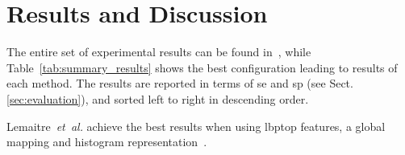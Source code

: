 \section{Results and Discussion}\label{sec:results}\label{sec:discussion}

The entire set of experimental results can be found in~\cite{rethinopaty20016apr-repoICPR}, while Table~\ref{tab:summary_results} shows the best configuration leading to results of each method.
The results are reported in terms of \gls{se} and \gls{sp} (see Sect.\,\ref{sec:evaluation}), and sorted left to right in descending order.

Lemaitre~\emph{et~al.} achieve the best results when using \gls{lbptop} features, a global mapping and histogram representation~\cite{Lemaintre2015miccaiOCT}.


